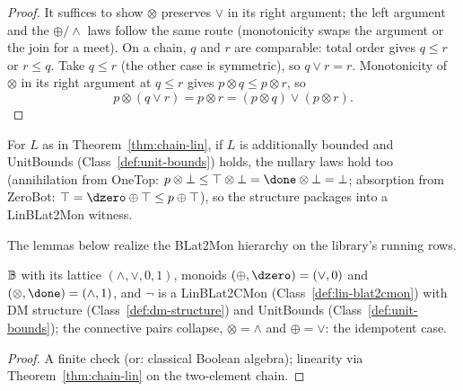 \begin{proof}
\leanok
It suffices to show $\otimes$ preserves $\vee$ in its right argument;
the left argument and the $\oplus/\wedge$ laws follow the same route
(monotonicity swaps the argument or the join for a meet). On a chain,
$q$ and $r$ are comparable: total order gives $q \le r$ or $r \le q$.
Take $q \le r$ (the other case is symmetric), so $q \vee r = r$.
Monotonicity of $\otimes$ in its right argument at $q \le r$ gives
$p \otimes q \le p \otimes r$, so
\[
  p \otimes (q \vee r) = p \otimes r = (p \otimes q) \vee (p \otimes r).
\]
\end{proof}

\begin{definition}
\label{def:chain-lin-unitbounds}
\leanok
For $L$ as in Theorem~\ref{thm:chain-lin}, if $L$ is additionally
bounded and UnitBounds (Class~\ref{def:unit-bounds}) holds, the
nullary laws hold too (annihilation from OneTop: $p \otimes \bot \le
\top \otimes \bot = \done \otimes \bot = \bot$; absorption from
ZeroBot: $\top = \dzero \oplus \top \le p \oplus \top$), so the
structure packages into a LinBLat2Mon witness.
\end{definition}

The lemmas below realize the BLat2Mon hierarchy on the library's
running rows.

\begin{lemma}
\label{lem:bool-truth-structure}
\leanok
$\mathbb B$ with its lattice $(\wedge,\vee,0,1)$, monoids
$(\oplus,\dzero) = (\vee,0)$ and $(\otimes,\done) = (\wedge,1)$, and
$\neg$ is a LinBLat2CMon (Class~\ref{def:lin-blat2cmon}) with DM
structure (Class~\ref{def:dm-structure}) and UnitBounds
(Class~\ref{def:unit-bounds}); the connective pairs collapse,
$\otimes = \wedge$ and $\oplus = \vee$: the idempotent case.
\end{lemma}

\begin{proof}
\leanok
A finite check (or: classical Boolean algebra); linearity via
Theorem~\ref{thm:chain-lin} on the two-element chain.
\end{proof}

